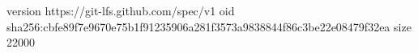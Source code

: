 version https://git-lfs.github.com/spec/v1
oid sha256:cbfe89f7e9670e75b1f91235906a281f3573a9838844f86c3be22e08479f32ea
size 22000
